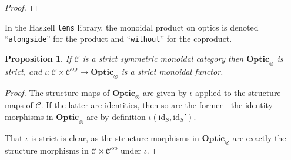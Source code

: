 \documentclass[11pt,letterpaper]{article}
\theoremstyle{plain}
\newtheorem{proposition}[theorem]{Proposition}
\theoremstyle{definition}
\newcommand{\C}{\mathscr{C}}
\newcommand{\lenslib}{\texttt{lens}}
\newcommand{\Optic}{\mathbf{Optic}}
\newcommand{\id}{\mathrm{id}}
\newcommand{\op}{\mathrm{op}}
\newcommand{\rep}[2]{{\ensuremath \left\langle #1 \mid #2 \right\rangle}}
\newcommand{\hto}{\ensuremath{\,\mathaccent\shortmid\rightarrow\,}}
\newcommand{\todo}[1]{\textcolor{red}{\small #1}}
\begin{document}
\begin{proof}
%
\end{proof}

  In the Haskell \lenslib{} library, the monoidal product on optics is denoted ``\texttt{alongside}'' for the product and ``\texttt{without}'' for the coproduct.

\begin{proposition}
  If $\C$ is a strict symmetric monoidal category then $\Optic_\otimes$ is strict, and $\iota : \C \times \C^\op \to \Optic_\otimes$ is a strict monoidal functor.
\end{proposition}
\begin{proof}
  The structure maps of $\Optic_\otimes$ are given by $\iota$ applied to the structure maps of $\C$. If the latter are identities, then so are the former---the identity morphisms in $\Optic_\otimes$ are by definition $\iota(\id_S, \id_S')$.

  That $\iota$ is strict is clear, as the structure morphisms in $\Optic_\otimes$ are exactly the structure morphisms in $\C \times \C^\op$ under $\iota$.
\end{proof}
\end{document}
